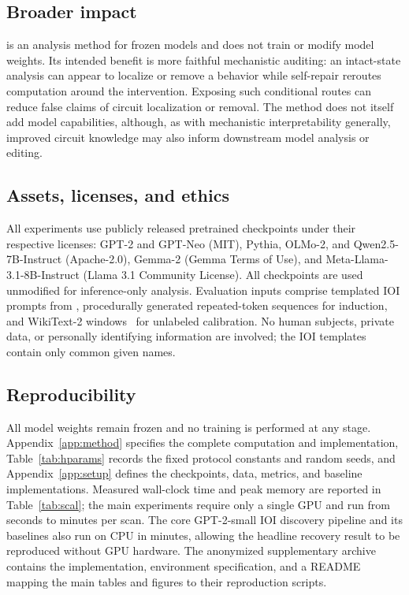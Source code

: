 \subsection{Broader impact}

\coax is an analysis method for frozen models and does not train or modify model weights.
Its intended benefit is more faithful mechanistic auditing: an intact-state analysis can appear to localize or remove a behavior while self-repair reroutes computation around the intervention.
Exposing such conditional routes can reduce false claims of circuit localization or removal.
The method does not itself add model capabilities, although, as with mechanistic interpretability generally, improved circuit knowledge may also inform downstream model analysis or editing.

\subsection{Assets, licenses, and ethics}

All experiments use publicly released pretrained checkpoints under their respective licenses: GPT-2 and GPT-Neo (MIT), Pythia, OLMo-2, and Qwen2.5-7B-Instruct (Apache-2.0), Gemma-2 (Gemma Terms of Use), and Meta-Llama-3.1-8B-Instruct (Llama 3.1 Community License).
All checkpoints are used unmodified for inference-only analysis.
Evaluation inputs comprise templated IOI prompts from \citet{wang2022ioi}, procedurally generated repeated-token sequences for induction, and WikiText-2 windows~\citep{merity2017wikitext} for unlabeled calibration.
No human subjects, private data, or personally identifying information are involved; the IOI templates contain only common given names.

\subsection{Reproducibility}
\label{app:repro}

All model weights remain frozen and no training is performed at any stage.
Appendix~\ref{app:method} specifies the complete \coax computation and implementation, Table~\ref{tab:hparams} records the fixed protocol constants and random seeds, and Appendix~\ref{app:setup} defines the checkpoints, data, metrics, and baseline implementations.
Measured wall-clock time and peak memory are reported in Table~\ref{tab:scal}; the main experiments require only a single GPU and run from seconds to minutes per scan.
The core GPT-2-small IOI discovery pipeline and its baselines also run on CPU in minutes, allowing the headline recovery result to be reproduced without GPU hardware.
The anonymized supplementary archive contains the implementation, environment specification, and a README mapping the main tables and figures to their reproduction scripts.
